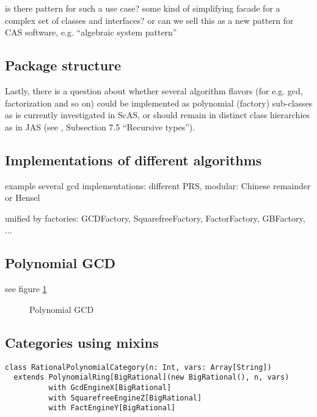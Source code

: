 \documentclass{llncs}
\begin{document}
is there pattern \cite{Gamma:1995} for such a use case? some kind of
simplifying facade for a complex set of classes and interfaces? or can
we sell this as a new pattern for CAS software, e.g. ``algebraic system pattern'' 



\subsection{Package structure} %

Lastly, there is a question about whether several algorithm flavors
(for e.g. gcd, factorization and so on) could be implemented as
polynomial (factory) sub-classes as is currently investigated in ScAS,
or should remain in distinct class hierarchies as in JAS (see
\cite{Kredel:2008}, Subsection 7.5 ``Recursive types'').


\subsection{Implementations of different algorithms} %

example several gcd implementations: different PRS, modular: Chinese
remainder or Hensel

unified by factories:
GCDFactory, SquarefreeFactory, FactorFactory, GBFactory, ...

\subsection{Polynomial GCD} %

see figure \ref{fig:poly}

\begin{figure}[thb]
\centering
{}
\caption{Polynomial GCD}
\label{fig:poly}
\end{figure}

\subsection{Categories using mixins} %


\begin{verbatim}
class RationalPolynomialCategory(n: Int, vars: Array[String])
  extends PolynomialRing[BigRational](new BigRational(), n, vars)
          with GcdEngineX[BigRational] 
          with SquarefreeEngineZ[BigRational]
          with FactEngineY[BigRational]
\end{verbatim}
\end{document}
